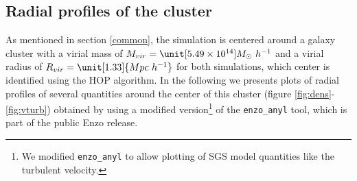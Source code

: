 \subsection{Radial profiles of the cluster}
As mentioned in section \ref{common}, the simulation is centered around a
galaxy cluster with a virial mass of $M_{vir}=\unit[5.49 \times
10^{14}]{M_{\odot}\ h^{-1}}$ and a virial radius of $R_{vir}=\unit[1.33]{Mpc\
h^{-1}}$ for both simulations, which center is identified using the
HOP algorithm. In the following we presents plots of radial profiles of several
quantities around the center of this cluster (figure
\ref{fig:dens}-\ref{fig:vturb})
obtained by using a modified version\footnote{We modified \texttt{enzo\_anyl} to
allow plotting of SGS model quantities like the turbulent velocity.} of the
\texttt{enzo\_anyl} tool, which is part of the public Enzo release.   
